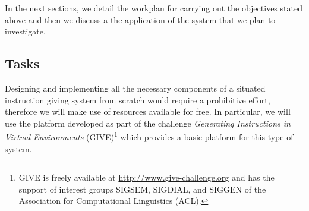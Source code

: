 
In the next sections, we detail the workplan for carrying out the objectives
stated above and then we discuss a the application of the system that we plan
to investigate. 

\subsection{Tasks}
% 

Designing and implementing all the necessary components of a
situated instruction giving system from scratch would require a prohibitive
effort, therefore we will make use of resources available for free. In
particular, we will use the platform developed as part of
the challenge \emph{Generating Instructions in Virtual Environments}
(GIVE)\footnote{GIVE is freely available at \url{http://www.give-challenge.org}
and has the support of interest groups SIGSEM, SIGDIAL, and SIGGEN of the
Association for Computational Linguistics (ACL).} which provides a basic
platform for this type of system.



